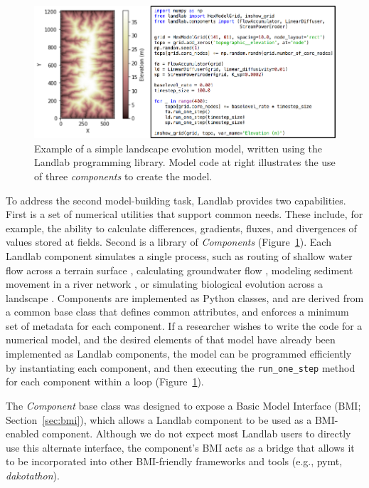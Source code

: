 \documentclass{article} %
\begin{document}
\begin{figure}[h!]
\centering
\includegraphics{Figures/landlab_component_lem.pdf}
\caption{Example of a simple landscape evolution model, written using the Landlab programming library. Model code at right illustrates the use of three \textit{components} to create the model.}
\label{fig:landlablem}
\end{figure}

To address the second model-building task, Landlab provides two capabilities. First is a set of numerical utilities that support common needs. These include, for example, the ability to calculate differences, gradients, fluxes, and divergences of values stored at fields. Second is a library of \textit{Components} (Figure~\ref{fig:landlablem}). Each Landlab component simulates a single process, such as routing of shallow water flow across a terrain surface \citep{adams2017landlab}, calculating groundwater flow \citep{litwin2020groundwaterdupuitpercolator}, modeling sediment movement in a river network \citep{pfeiffer2020networksedimenttransporter}, or simulating biological evolution across a landscape \citep{lyons2020speciesevolver}. Components are implemented as Python classes, and are derived from a common base class that defines common attributes, and enforces a minimum set of metadata for each component. If a researcher wishes to write the code for a numerical model, and the desired elements of that model have already been implemented as Landlab components, the model can be programmed efficiently by instantiating each component, and then executing the \texttt{run\_one\_step} method for each component within a loop (Figure~\ref{fig:landlablem}).

The \textit{Component} base class was designed to expose a Basic Model Interface (BMI; Section~\ref{sec:bmi}), which allows a Landlab component to be used as a BMI-enabled component.
Although we do not expect most Landlab users to directly use this alternate interface, the
component's BMI acts as a bridge that allows it to be incorporated into other BMI-friendly
frameworks and tools (e.g., pymt, \textit{dakotathon}).
\end{document}
